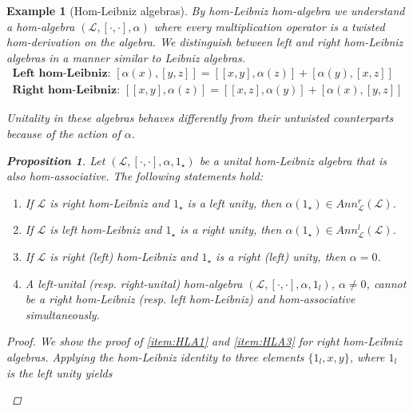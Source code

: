 \documentclass[12pt]{article}
\newtheorem{proposition}[theorem]{Proposition}
\newtheorem{example}[theorem]{Example}
\begin{document}
		\begin{example}[Hom-Leibniz algebras]\label{ssec:LeibnizHom}
			By hom-Leibniz hom-algebra we understand a hom-algebra $(\mathcal{L},[\cdot,\cdot],\alpha)$ where every multiplication operator is a twisted \textit{hom-derivation} on the algebra. We distinguish between left and right hom-Leibniz algebras in a manner similar to Leibniz algebras.
			\begin{align*}
				\textbf{Left hom-Leibniz: } [\alpha(x),[y,z]]=[[x,y],\alpha(z)]+[\alpha(y),[x,z]]\\
				\textbf{Right hom-Leibniz: } [[x,y],\alpha(z)]=[[x,z],\alpha(y)]+[\alpha(x),[y,z]]
			\end{align*}
			
			Unitality in these algebras behaves differently from their untwisted counterparts because of the action of $\alpha$.
			\begin{proposition}\label{prop:LeibnizHomCrossed}
				Let $(\mathcal{L},[\cdot,\cdot],\alpha,1_\star)$ be a unital hom-Leibniz algebra that is also hom-associative. The following statements hold:
				\begin{enumerate}[label=\textnormal{\arabic*)},ref=\textnormal{\arabic*}]
					\item\label{item:HLA1} If $\mathcal{L}$ is right hom-Leibniz and $1_\star$ is a left unity, then $\alpha(1_\star)\in Ann_\mathcal{L}^r(\mathcal{L})$.
					\item\label{item:HLA2} If $\mathcal{L}$ is left hom-Leibniz and $1_\star$ is a right unity, then $\alpha(1_\star)\in Ann_\mathcal{L}^l(\mathcal{L})$.
					\item\label{item:HLA3} If $\mathcal{L}$ is right \textnormal{(}left\textnormal{)} hom-Leibniz and $1_\star$ is a right \textnormal{(}left\textnormal{)} unity, then $\alpha=0$.
					\item\label{item:HLA4}  A left-unital {\rm(}resp. right-unital\/{\rm)} hom-algebra $(\mathcal{L},[\cdot,\cdot],\alpha,1_l)$, $\alpha\neq 0$, cannot be a right hom-Leibniz \textnormal{(}resp. left hom-Leibniz\textnormal{)} and hom-associative simultaneously.
				\end{enumerate}
			\end{proposition}
			\begin{proof}
				We show the proof of \ref{item:HLA1} and \ref{item:HLA3} for right hom-Leibniz algebras. Applying the hom-Leibniz identity to three elements $\{1_l,x,y\}$, where $1_l$ is the left unity yields
				\begin{enumerate}[label=,leftmargin=*]

\end{enumerate}
\end{proof}
\end{example}
\end{document}
